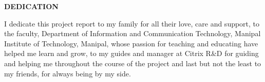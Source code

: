 \begin{center}
	\large\textbf{DEDICATION}\\
	\vspace{1cm}
\end{center}
\begin{center}
	\justify I dedicate this project report to my family for all their love, care and support, to the faculty, Department of Information and Communication Technology, Manipal Institute of Technology, Manipal, whose passion for teaching and educating have helped me learn and grow, to my guides and manager at Citrix R\&D for guiding and helping me throughout the course of the project and last but not the least to my friends, for always being by my side.  
\end{center}